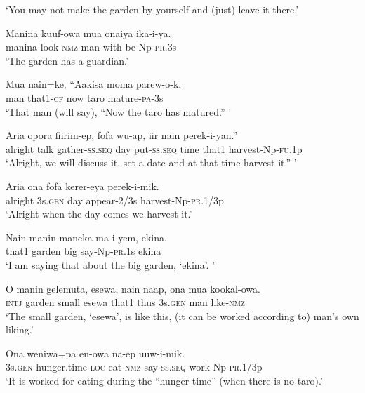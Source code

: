 \glt ‘You may not make the garden by yourself and (just) leave it there.’ \\
\z


\ea
\gll  Manina  kuuf-owa  mua  onaiya  ika-i-ya. \\
manina  look-\textsc{nmz}  man  with  be-Np-\textsc{pr}.3s \\
\glt ‘The garden has a guardian.’ \\
\z


\ea
\gll  Mua  nain=ke,  “Aakisa  moma  parew-o-k. \\
man  that1-\textsc{cf}  now  taro  mature-\textsc{pa}-3s \\
\glt ‘That man (will say), “Now the taro has matured.” ’ \\
\z


\ea
\gll  Aria  opora  fiirim-ep,  fofa  wu-ap,  iir  nain  perek-i-yan.” \\
alright  talk  gather-\textsc{ss.seq}  day  put-\textsc{ss.seq}  time  that1  harvest-Np-\textsc{fu}.1p \\
\glt ‘Alright, we will discuss it, set a date and at that time harvest it.” ’ \\
\z


\ea
\gll  Aria  ona  fofa  kerer-eya  perek-i-mik. \\
alright  3s.\textsc{gen}  day  appear-2/3s  harvest-Np-\textsc{pr}.1/3p \\
\glt ‘Alright when the day comes we harvest it.’ \\
\z


\ea
\gll  Nain  manin  maneka  ma-i-yem,  ekina. \\
that1  garden  big  say-Np-\textsc{pr}.1s  ekina \\
\glt ‘I am saying that about the big garden, ‘ekina’. ’ \\
\z


\ea
\gll  O  manin  gelemuta,  esewa,  nain  naap,  ona  mua  kookal-owa. \\
\textsc{intj}  garden  small  esewa  that1  thus  3s.\textsc{gen}  man  like-\textsc{nmz} \\
\glt ‘The small garden, ‘esewa’, is like this, (it can be worked according to) man’s own liking.’ \\
\z


\ea
\gll  Ona  weniwa=pa  en-owa  na-ep  uuw-i-mik. \\
3s.\textsc{gen}  hunger.time-\textsc{loc}  eat-\textsc{nmz}  say-\textsc{ss.seq}  work-Np-\textsc{pr}.1/3p \\
\glt ‘It is worked for eating during the “hunger time” (when there is no taro).’ \\
\z


